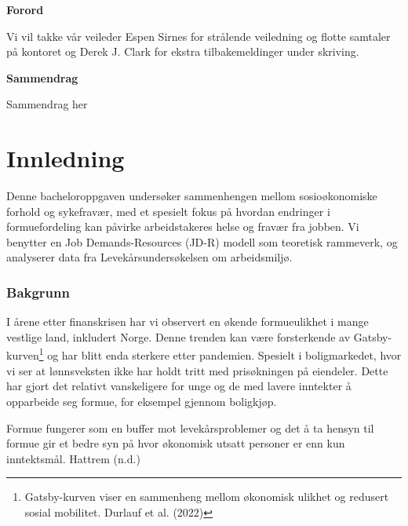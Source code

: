 \documentclass[
  12pt,
  a4paper,
  DIV=11,
  numbers=noendperiod]{scrartcl}
\renewcommand*\contentsname{Table of contents}
\newcommand\contentsname{Table of contents}
\begin{document}




\thispagestyle{plain}
\begin{center}
    \Large
    \textbf{Forord}
\end{center}

Vi vil takke vår veileder Espen Sirnes for strålende veiledning og
flotte samtaler på kontoret og Derek J. Clark for ekstra
tilbakemeldinger under skriving.

\newpage
\hypersetup{linkcolor=black}
\renewcommand{\contentsname}{Innholdsfortegnelse}
\renewcommand*{\figureautorefname}{Figur}
\renewcommand*{\tableautorefname}{Tabell}
\tableofcontents
\listoffigures
\listoftables
\hypersetup{linkcolor=blue}
\newpage
\thispagestyle{plain}
\begin{center}
    \Large
    \textbf{Sammendrag}
\end{center}

Sammendrag her

\newpage

\section{Innledning}\label{innledning}

Denne bacheloroppgaven undersøker sammenhengen mellom sosioøkonomiske
forhold og sykefravær, med et spesielt fokus på hvordan endringer i
formuefordeling kan påvirke arbeidstakeres helse og fravær fra jobben.
Vi benytter en Job Demands-Resources (JD-R) modell som teoretisk
rammeverk, og analyserer data fra Levekårsundersøkelsen om arbeidsmiljø.

\subsubsection{Bakgrunn}\label{bakgrunn}

I årene etter finanskrisen har vi observert en økende formueulikhet i
mange vestlige land, inkludert Norge. Denne trenden kan være
forsterkende av Gatsby-kurven\footnote{Gatsby-kurven viser en sammenheng
  mellom økonomisk ulikhet og redusert sosial mobilitet. Durlauf et al.
  (2022)} og har blitt enda sterkere etter pandemien. Spesielt i
boligmarkedet, hvor vi ser at lønnsveksten ikke har holdt tritt med
prisøkningen på eiendeler. Dette har gjort det relativt vanskeligere for
unge og de med lavere inntekter å opparbeide seg formue, for eksempel
gjennom boligkjøp.

Formue fungerer som en buffer mot levekårsproblemer og det å ta hensyn
til formue gir et bedre syn på hvor økonomisk utsatt personer er enn kun
inntektsmål. Hattrem (n.d.)
\end{document}
